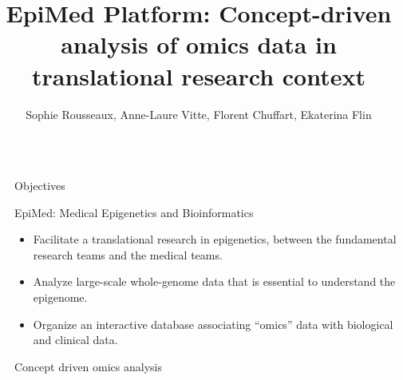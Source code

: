 \documentclass[final]{beamer}
\title{EpiMed Platform: Concept-driven analysis of omics data in translational research context} %
\author{Sophie Rousseaux, Anne-Laure Vitte, Florent Chuffart, Ekaterina Flin} %
\institute{IAB (U1209/UMR5309)} %
\newlength{\sepwid}
\newlength{\twocolwid}
\begin{document}

\setlength{\belowcaptionskip}{2ex} %
\setlength\belowdisplayshortskip{2ex} %

\begin{frame}[t] %

\begin{columns}[t] %

\begin{column}{\sepwid}\end{column} %

\begin{column}{\twocolwid} %


\begin{alertblock}{Objectives}

EpiMed: Medical Epigenetics and Bioinformatics

\begin{itemize}
\item Facilitate a translational research in epigenetics, between the fundamental research teams and the medical teams.
\item Analyze large-scale whole-genome data that is essential to understand the epigenome.
\item Organize an interactive database associating “omics” data with biological and clinical data.
\end{itemize}

\end{alertblock}



\begin{block}{Concept driven omics analysis}


\end{block}
\end{column}
\end{columns}
\end{frame}
\end{document}
